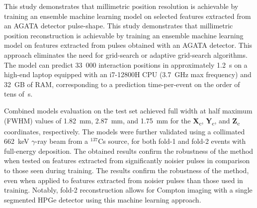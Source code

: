 
This study demonstrates that millimetric position resolution is achievable by training an ensemble machine learning model on selected features extracted from an AGATA detector pulse-shape.
%
This study demonstrates that millimetric position reconstruction is achievable by training an ensemble machine learning model on features extracted from pulses obtained with an AGATA detector. 
This approach eliminates the need for grid-search or adaptive grid-search algorithms. The model can predict 33~000 interaction positions in approximately 1.2~s on a high-end laptop equipped with an i7-12800H CPU (3.7~GHz max frequency) and 32~GB of RAM, corresponding to a prediction time-per-event on the order of tens of~\textmu s.

Combined models evaluation on the test set achieved full width at half maximum (FWHM) values of 1.82~mm, 2.87~mm, and 1.75~mm for the \textbf{X}\textsubscript{c}, \textbf{Y}\textsubscript{c}, and \textbf{Z}\textsubscript{c} coordinates, respectively. 
%
The models were further validated using a collimated 662~keV $\gamma$-ray beam from a $^{137}$Cs source, for both fold-1 and fold-2 events with full-energy deposition. 
The obtained results confirm the robustness of the method when tested on features extracted from significantly noisier pulses in comparison to those seen during training.
%
The results confirm the robustness of the method, even when applied to features extracted from noisier pulses than those used in training. 
Notably, fold-2 reconstruction allows for Compton imaging with a single segmented HPGe detector using this machine learning approach.



